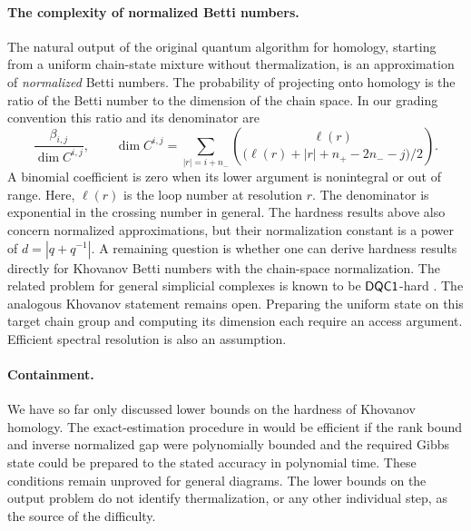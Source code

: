 \documentclass[a4paper,onecolumn,unpublished]{quantumarticle}
\theoremstyle{plain}
\theoremstyle{definition}
\theoremstyle{definition}
\numberwithin{equation}{section}
\begin{document}
\paragraph{The complexity of normalized Betti numbers.}
The natural output of the original quantum algorithm for homology, starting from a uniform chain-state mixture without thermalization, is an approximation of \emph{normalized} Betti numbers. The probability of projecting onto homology is the ratio of the Betti number to the dimension of the chain space. In our grading convention this ratio and its denominator are
\[
 \frac{\beta_{i,j}}{\dim C^{i,j}},\qquad
 \dim C^{i,j}
 =\sum_{|r|=i+n_-}
 \binom{\ell(r)}{
 \bigl(\ell(r)+|r|+n_+-2n_- -j\bigr)/2}.
\]
A binomial coefficient is zero when its lower argument is nonintegral or out of range. Here, \(\ell(r)\) is the loop number at resolution \(r\). The denominator is exponential in the crossing number in general. The hardness results above also concern normalized approximations, but their normalization constant is a power of \(d=|q+q^{-1}|\). A remaining question is whether one can derive hardness results directly for Khovanov Betti numbers with the chain-space normalization. The related problem for general simplicial complexes is known to be \(\mathsf{DQC1}\)-hard \cite{quantumAdvantage,cade2021complexity}. The analogous Khovanov statement remains open. Preparing the uniform state on this target chain group and computing its dimension each require an access argument. Efficient spectral resolution is also an assumption.

\paragraph{Containment.}
We have so far only discussed lower bounds on the hardness of Khovanov homology. The exact-estimation procedure in  would be efficient if the rank bound and inverse normalized gap were polynomially bounded and the required Gibbs state could be prepared to the stated accuracy in polynomial time. These conditions remain unproved for general diagrams. The lower bounds on the output problem do not identify thermalization, or any other individual step, as the source of the difficulty.
\end{document}
